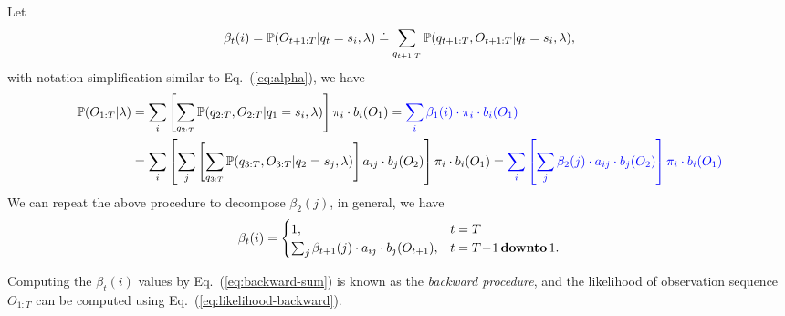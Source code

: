 Let 
\begin{equation}
\label{eq:beta}
\beta_t(i) = \mathbb{P}(O_{t+1:T} |q_t = s_i, \lambda) \doteq \sum_{q_{t+1:T}} \mathbb{P}(q_{t+1:T}, O_{t+1:T} |q_t = s_i, \lambda),
\end{equation}
with notation simplification similar to Eq.~(\ref{eq:alpha}), we have
\begin{alignat}{2}
\mathbb{P}(O_{1:T} |\lambda) 
&= \sum_{i} \left[ \sum_{q_{2:T}} \mathbb{P}(q_{2:T}, O_{2:T} |q_1 = s_i, \lambda) \right] \pi_i \cdot b_i(O_1) 
 = {\color{blue}{\sum_{i} \beta_1(i) \cdot \pi_i \cdot b_i(O_1)}}  \label{eq:likelihood-backward} \\
&= \sum_{i} \left[ \sum_{j} \left[ \sum_{q_{3:T}} \mathbb{P}(q_{3:T}, O_{3:T} |q_2 = s_j, \lambda) \right] a_{ij} \cdot b_j(O_2) \right] \pi_i \cdot b_i(O_1) 
 = {\color{blue}{\sum_{i} \left[ \sum_{j} \beta_2(j) \cdot a_{ij} \cdot b_j(O_2) \right] \pi_i \cdot b_i(O_1)}}  \nonumber
\end{alignat}
We can repeat the above procedure to decompose $\beta_2(j)$, in general, we have
\begin{equation}
\label{eq:backward-sum}
\beta_t(i) = \begin{cases}
              1, & t=T \\
              \sum_{j} \beta_{t+1}(j) \cdot a_{ij} \cdot b_j(O_{t+1}), & t=T\!-\!1 \,\textbf{downto}\, 1.
             \end{cases}
\end{equation}

Computing the $\beta_t(i)$ values by Eq.~(\ref{eq:backward-sum}) is known as the \emph{backward procedure}, 
and the likelihood of observation sequence $O_{1:T}$ can be computed using Eq.~(\ref{eq:likelihood-backward}).

